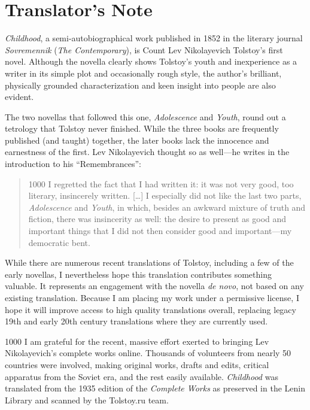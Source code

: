 \chapter{Translator's Note}

\textit{Childhood}, a semi-autobiographical work published in 1852 in the literary journal \textit{Sovremennik} (\textit{The Contemporary}), is Count Lev Nikolayevich Tolstoy's first novel. Although the novella clearly shows Tolstoy's youth and inexperience as a writer in its simple plot and occasionally rough style, the author's brilliant, physically grounded characterization and keen insight into people are also evident.

The two novellas that followed this one, \textit{Adolescence} and \textit{Youth}, round out a tetrology that Tolstoy never finished. While the three books are frequently published (and taught) together, the later books lack the innocence and earnestness of the first. Lev Nikolayevich thought so as well---he writes in the introduction to his ``Remembrances'':

\begin{quotation}
\begin{tolerant}{1000}
I regretted the fact that I had written it: it was not very good, too literary, insincerely written. [\ldots{}] I especially did not like the last two parts, \textit{Adolescence} and \textit{Youth}, in which, besides an awkward mixture of truth and fiction, there was insincerity as well: the desire to present as good and important things that I did not then consider good and important---my democratic bent.
\end{tolerant}
\end{quotation}

While there are numerous recent translations of Tolstoy, including a few of the early novellas, I nevertheless hope this translation contributes something valuable. It represents an engagement with the novella \textit{de novo}, not based on any existing translation. Because I am placing my work under a permissive license, I hope it will improve access to high quality translations overall, replacing legacy 19th and early 20th century translations where they are currently used.

\begin{tolerant}{1000}
I am grateful for the recent, massive effort exerted to bringing Lev Nikolayevich's complete works online. Thousands of volunteers from nearly 50 countries were involved, making original works, drafts and edits, critical apparatus from the Soviet era, and the rest easily available. \textit{Childhood} was translated from the 1935 edition of the \textit{Complete Works} as preserved in the Lenin Library and scanned by the Tolstoy.ru team.
\end{tolerant}

